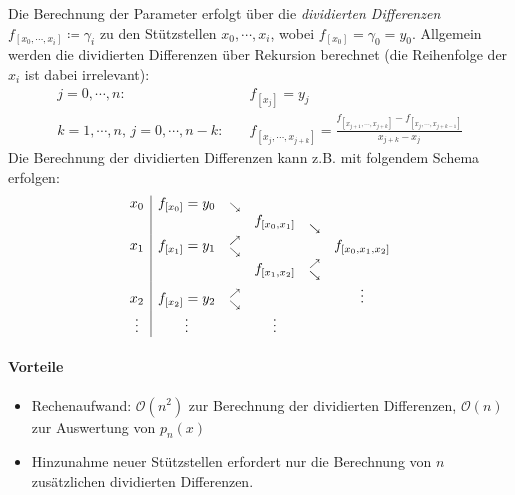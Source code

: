 \documentclass[a4paper, 11pt, accentcolor = tud3b]{tudreport}
\begin{document}
	            Die Berechnung der Parameter erfolgt über die \textit{dividierten Differenzen} \( f_{[x_0, \cdots, x_i]} \coloneqq \gamma_i \) zu den Stützstellen \( x_0, \cdots, x_i \), wobei \( f_{[x_0]} = \gamma_0 = y_0 \). Allgemein werden die dividierten Differenzen über Rekursion berechnet (die Reihenfolge der \(x_i\) ist dabei irrelevant):
	            \begin{align*}
		            j = 0, \cdots, n: &\quad f_{[x_j]} = y_j \\
		            k = 1, \cdots, n,\, j = 0, \cdots, n - k: &\quad f_{[x_j, \cdots, x_{j+k}]} = \frac{f_{[x_{j + 1}, \cdots, x_{j+k}]} - f_{[x_j, \cdots, x_{j+k-1}]}}{{x_{j+k} - x_j}}
	            \end{align*}
	            Die Berechnung der dividierten Differenzen kann z.B. mit folgendem Schema erfolgen:
	            \begin{equation*}
		            \begin{array}{c | ccccc}
		            	 x_0   & f_{[x_0]} = y_0 &           \raisebox{-4pt}{\( \overset{\searrow}{} \)}           &  \\
		            	       &                 &                                                                 & f_{[x_0, x_1]} &           \raisebox{-7pt}{\( \overset{\searrow}{} \)}           &  \\
		            	 x_1   & f_{[x_1]} = y_1 & \raisebox{-6pt}{\( \overset{\nearrow}{\overset{\searrow}{}} \)} &                &                                                                 & f_{[x_0, x_1, x_2]} \\
		            	       &                 &                                                                 & f_{[x_1, x_2]} & \raisebox{-6pt}{\( \overset{\nearrow}{\overset{\searrow}{}} \)} &  \\
		            	 x_2   & f_{[x_2]} = y_2 & \raisebox{-6pt}{\( \overset{\nearrow}{\overset{\searrow}{}} \)} &                &                                                                 &       \vdots        \\
		            	\vdots & \vdots          &                                                                 &     \vdots     &
		            \end{array}
	            \end{equation*}
	            
	            \paragraph{Vorteile}
		            \begin{itemize}
		            	\item Rechenaufwand: \( \mathcal{O}(n^2) \) zur Berechnung der dividierten Differenzen, \( \mathcal{O}(n) \) zur Auswertung von \( p_n(x) \)
		            	\item Hinzunahme neuer Stützstellen erfordert nur die Berechnung von \(n\) zusätzlichen dividierten Differenzen.
		            \end{itemize}
	
\end{document}
